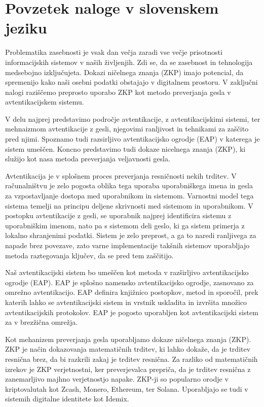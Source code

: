 \chapter{Povzetek naloge v slovenskem jeziku}
Problematika zasebnosti je vsak dan večja zaradi vse večje prisotnosti informacijskih sistemov v naših življenjih. Zdi se, da se zasebnost in tehnologija medsebojno izključujeta. Dokazi ničelnega znanja (ZKP) imajo potencial, da spremenijo kako naši osebni podatki obstajajo v digitalnem prostoru.
V zaključni nalogi raziščemo preprosto uporabo ZKP kot metodo preverjanja gesla v avtentikacijskem sistemu.


V delu najprej predstavimo področje avtentikacije, z avtentikacijskimi sistemi, ter mehnaizmom avtentikacije z gesli, njegovimi ranljivost in tehnikami za zaščito pred njimi.
Spoznamo tudi razsirljivo avtentikacijsko ogrodje (EAP) v katerega je sistem umeščen.
Koncno predstavimo tudi dokaze nicelnega znanja (ZKP), ki služijo kot nasa metoda preverjanja veljavnosti gesla.

Avtentikacija je v splošnem proces preverjanja resničnosti nekih trditev. V računalništvu je zelo pogosta oblika tega uporaba uporabniškega imena in gesla za vzpostavljanje dostopa med uporabnikom in sistemom.
Varnostni model tega sistema temelji na principu deljene skrivnosti med sistemom in uporabnikom.
V postopku avtentikacije z gesli, se uporabnik najprej identificira sistemu z uporabniškim imenom, nato pa s sistemom deli geslo, ki ga sistem primerja z lokalno shranjenimi podatki.
Sistem je zelo preprost, a ga to naredi ranljivega za napade brez povezave, zato varne implementacije takšnih sistemov uporabljajo metoda raztegovanja ključev, da se pred tem zaščitijo.

Naš avtentikacijski sistem bo umeščen kot metoda v razširljivo avtentikacijsko ogrodje (EAP).
EAP je splošno namensko avtentikacijsko ogrodje, zasnovano za omrežno avtentikacijo. EAP definira knjižnico postopkov, metod in sporočil, prek katerih lahko se avtentikacijski sistem in vrstnik uskladita in izvršita množico avtentikacijskih protokolov. 
EAP je pogosto uporabljen kot avtentikacijski sistem za v brezžična omrežja.


Kot mehanizem preverjanja gesla uporabljamo dokaze ničelnega znanja (ZKP).
ZKP je način dokazovanja matematičnih trditev, ki lahko dokaže, da je trditev resnična brez, da bi razkrili zakaj je trditev resnična.
Za razliko od matematičnih izrekov je ZKP verjetnostni, ker preverjevalca prepriča, da je trditev resnična z zanemarljivo majhno verjetnostjo napake.
ZKP-ji so popularno orodje v kriptovalutah kot Zcash, Monero, Ethereum, ter Solana. Uporabljajo se tudi v sistemih digitalne identitete kot Idemix.

